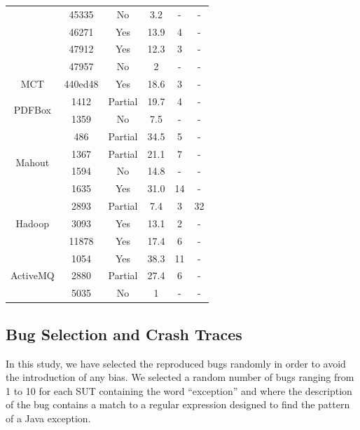 \documentclass[12pt]{report}
\begin{document}
\begin{table}[]
\begin{tabular}{c|c|c|c|c|c}
                            & 45335    & No      & 3.2    & -  & -       \\
                            & 46271    & Yes     & 13.9   & 4  & -       \\
                            & 47912    & Yes     & 12.3   & 3  & -       \\
                            & 47957    & No      & 2      & -  & -       \\ \hline
MCT                         & 440ed48  & Yes     & 18.6   & 3  & -       \\ \hline
\multirow{2}{*}{PDFBox}     & 1412     & Partial & 19.7   & 4  & -       \\
                            & 1359     & No      & 7.5    & -    & - \\ \hline
\multirow{4}{*}{Mahout}     & 486      & Partial & 34.5   & 5    & -        \\
                            & 1367     & Partial & 21.1   & 7  & -       \\
                            & 1594     & No      & 14.8       & -  & -       \\
                            & 1635     & Yes     & 31.0   & 14  & - \\ \hline
\multirow{3}{*}{Hadoop}     & 2893     & Partial & 7.4    & 3  & 32       \\
                            & 3093      & Yes      & 13.1     & 2     & -   \\
                            & 11878    & Yes     & 17.4     & 6 & - \\  \hline
\multirow{3}{*}{ActiveMQ}   & 1054     & Yes     & 38.3   & 11  & -      \\
                            & 2880      & Partial  & 27.4    & 6    & -       \\
                            & 5035     & No      & 1  & -  & - \\  \hline \hline
\end{tabular}


\label{tab:jcharming-results}
\end{table}

\subsection{Bug Selection and Crash
Traces}\label{bug-selection-and-crash-traces}

In this study, we have selected the reproduced bugs randomly in order to
avoid the introduction of any bias. We selected a random number of bugs
ranging from 1 to 10 for each SUT containing the word ``exception'' and
where the description of the bug contains a match to a regular
expression designed to find the pattern of a Java exception.
\end{document}
